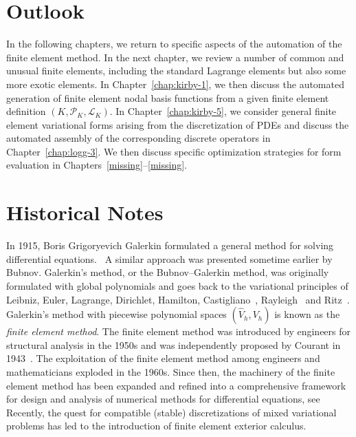 \section{Outlook}

In the following chapters, we return to specific aspects of the
automation of the finite element method. In the next chapter, we
review a number of common and unusual finite elements, including the
standard Lagrange elements but also some more exotic elements. In
Chapter~\ref{chap:kirby-1}, we then discuss the automated generation of
finite element nodal basis functions from a given finite element
definition $(K, \mathcal{P}_K, \mathcal{L}_K)$. In
Chapter~\ref{chap:kirby-5}, we consider general finite element
variational forms arising from the discretization of PDEs and discuss
the automated assembly of the corresponding discrete operators in
Chapter~\ref{chap:logg-3}. We then discuss specific optimization
strategies for form evaluation in
Chapters~\ref{missing}--\ref{missing}.


\section{Historical Notes}

In 1915, Boris Grigoryevich Galerkin formulated a general method for
solving differential equations.~\cite{Galerkin1915} A similar approach
was presented sometime earlier by Bubnov. Galerkin's method, or the
Bubnov--Galerkin method, was originally formulated with global
polynomials and goes back to the variational principles of Leibniz,
Euler, Lagrange, Dirichlet, Hamilton,
Castigliano~\cite{Castigliano1879}, Rayleigh~\cite{Rayleigh1870} and
Ritz~\cite{Ritz1908}. Galerkin's method with piecewise polynomial
spaces $(\hat{V}_h,V_h)$ is known as the \emph{finite element
method}. The finite element method was introduced by engineers for
structural analysis in the 1950s and was independently proposed by
Courant in 1943~\cite{Courant1943}. The exploitation of the finite
element method among engineers and mathematicians exploded in the
1960s. Since then, the machinery of the finite element method has been
expanded and refined into a comprehensive framework for design and
analysis of numerical methods for differential equations,
see~\cite{ZienkiewiczTaylorEtAl2005firstpublishedin1967,StrangFix1973,Ciarlet1976,Ciarlet1978,BeckerCareyEtAl1981,Hughes1987,BrennerScott1994}
Recently, the quest for compatible (stable) discretizations of mixed
variational problems has led to the introduction of finite element
exterior calculus.~\cite{ArnoldFalkEtAl2006}

